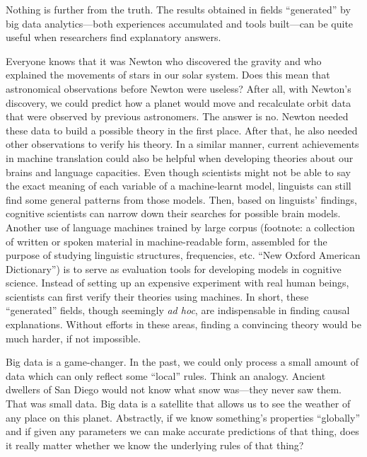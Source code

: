 \documentclass{writing}
\begin{document}
Nothing is further from the truth. The results obtained in fields
``generated'' by big data analytics---both experiences accumulated and
tools built---can be quite useful when researchers find explanatory
answers.

Everyone knows that it was Newton who discovered the gravity and who
explained the movements of stars in our solar system. Does this mean
that astronomical observations before Newton were useless? After all,
with Newton's discovery, we could predict how a planet would move and
recalculate orbit data that were observed by previous astronomers. The
answer is no. Newton needed these data to build a possible theory in the
first place. After that, he also needed other observations to verify his
theory. In a similar manner, current achievements in machine translation
could also be helpful when developing theories about our brains and
language capacities. Even though scientists might not be able to say the
exact meaning of each variable of a machine-learnt model, linguists can
still find some general patterns from those models. Then, based on
linguists' findings, cognitive scientists can narrow down their searches
for possible brain models. Another use of language machines trained by
large corpus (footnote: a collection of written or spoken material in
machine-readable form, assembled for the purpose of studying linguistic
structures, frequencies, etc. ``New Oxford American Dictionary'') is to
serve as evaluation tools for developing models in cognitive science.
Instead of setting up an expensive experiment with real human beings,
scientists can first verify their theories using machines. In short,
these ``generated'' fields, though seemingly \emph{ad hoc}, are
indispensable in finding causal explanations. Without efforts in these
areas, finding a convincing theory would be much harder, if not
impossible.

Big data is a game-changer. In the past, we could only process a small
amount of data which can only reflect some ``local'' rules. Think an
analogy. Ancient dwellers of San Diego would not know what snow
was---they never saw them. That was small data. Big data is a satellite
that allows us to see the weather of any place on this planet.
Abstractly, if we know something's properties ``globally'' and if given
any parameters we can make accurate predictions of that thing, does it
really matter whether we know the underlying rules of that thing?
\end{document}
